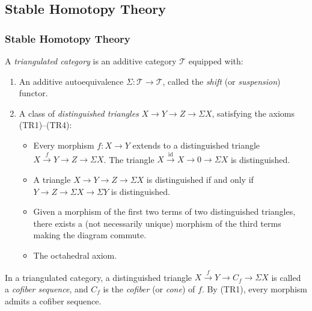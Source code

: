 \subsection{Stable Homotopy Theory}\label{sec:prereq-stable}

\subsubsection{Stable Homotopy Theory}\label{sec:prereq-stable-homotopy}

\begin{definition}\label{prereq:def:triangulated-category}
    A \emph{triangulated category} is an additive category $\mathcal{T}$ equipped with:
    \begin{enumerate}
        \item An additive autoequivalence $\Sigma: \mathcal{T} \to \mathcal{T}$, called the \emph{shift} (or \emph{suspension}) functor.
        \item A class of \emph{distinguished triangles} $X \to Y \to Z \to \Sigma X$, satisfying the axioms (TR1)--(TR4):
        \begin{itemize}
            \item[\textup{(TR1)}] Every morphism $f: X \to Y$ extends to a distinguished triangle $X \xrightarrow{f} Y \to Z \to \Sigma X$. The triangle $X \xrightarrow{\mathrm{id}} X \to 0 \to \Sigma X$ is distinguished.
            \item[\textup{(TR2)}] A triangle $X \to Y \to Z \to \Sigma X$ is distinguished if and only if $Y \to Z \to \Sigma X \to \Sigma Y$ is distinguished.
            \item[\textup{(TR3)}] Given a morphism of the first two terms of two distinguished triangles, there exists a (not necessarily unique) morphism of the third terms making the diagram commute.
            \item[\textup{(TR4)}] The octahedral axiom.
        \end{itemize}
    \end{enumerate}
\end{definition}

\begin{definition}\label{prereq:def:cofiber-sequence}
    \leanok
    In a triangulated category, a distinguished triangle $X \xrightarrow{f} Y \to C_f \to \Sigma X$ is called a \emph{cofiber sequence}, and $C_f$ is the \emph{cofiber} (or \emph{cone}) of $f$. By (TR1), every morphism admits a cofiber sequence.
\end{definition}

